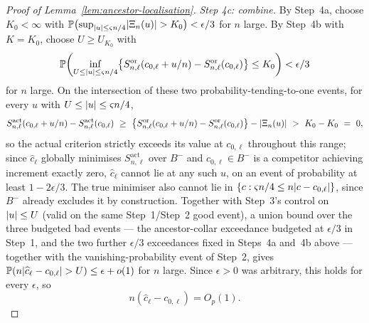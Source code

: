 \documentclass[11pt]{article}
\theoremstyle{plain}
\theoremstyle{definition}
\theoremstyle{remark}
\newcommand{\PP}{\mathbb{P}}
\DeclarePairedDelimiter{\abs}{\lvert}{\rvert}
\begin{document}
\begin{proof}[Proof of Lemma~\ref{lem:ancestor-localisation}]
\emph{Step 4c: combine.} By Step~4a, choose $K_0<\infty$ with
$\PP\bigl(\sup_{\abs u\le\varsigma n/4}\abs{\Xi_n(u)}>K_0\bigr)<\epsilon/3$
for $n$ large. By Step~4b with $K=K_0$, choose $U\ge U_{K_0}$ with
\[
  \PP\!\left(
    \inf_{U\le\abs u\le\varsigma n/4}
    \bigl\{S^{\mathrm{or}}_{n,\ell}(c_{0,\ell}+u/n)
      -S^{\mathrm{or}}_{n,\ell}(c_{0,\ell})\bigr\}
    \le K_0
  \right)
  <\epsilon/3
\]
for $n$ large. On the intersection of these two probability-tending-to-one
events, for every $u$ with $U\le\abs u\le\varsigma n/4$,
\[
  S^{\mathrm{act}}_{n,\ell}(c_{0,\ell}+u/n)-S^{\mathrm{act}}_{n,\ell}(c_{0,\ell})
  \ \ge\
  \bigl\{S^{\mathrm{or}}_{n,\ell}(c_{0,\ell}+u/n)
    -S^{\mathrm{or}}_{n,\ell}(c_{0,\ell})\bigr\}
  -\abs{\Xi_n(u)}
  \ >\ K_0-K_0\ =\ 0,
\]
so the actual criterion strictly exceeds its value at $c_{0,\ell}$
throughout this range; since $\widehat c_\ell$ globally minimises
$S^{\mathrm{act}}_{n,\ell}$ over $B^-$ and $c_{0,\ell}\in B^-$ is a
competitor achieving increment exactly zero, $\widehat c_\ell$ cannot lie at
any such $u$, on an event of probability at least $1-2\epsilon/3$. The true
minimiser also cannot lie in $\{c:\varsigma n/4\le n\abs{c-c_{0,\ell}}\}$,
since $B^-$ already excludes it by construction. Together with Step~3's
control on $\abs u\le U$ (valid on the same Step~1/Step~2 good event), a
union bound over the three budgeted bad events --- the ancestor-collar
exceedance budgeted at $\epsilon/3$ in Step~1, and the two further
$\epsilon/3$ exceedances fixed in Steps~4a and~4b above --- together with
the vanishing-probability event of Step~2, gives
$\PP(n\abs{\widehat c_\ell-c_{0,\ell}}>U)\le\epsilon+o(1)$ for $n$ large.
Since $\epsilon>0$ was arbitrary, this holds for every $\epsilon$, so
\[
  n(\widehat c_\ell-c_{0,\ell})=O_p(1).
\]
\end{proof}
\end{document}
